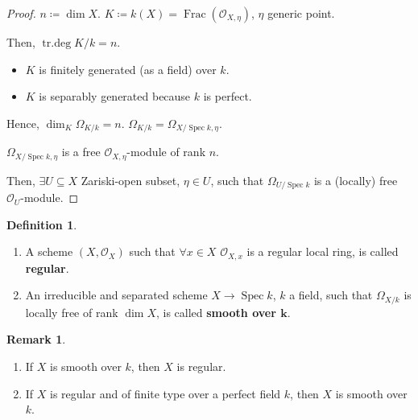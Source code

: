 \documentclass[12pt]{article}
\DeclareMathOperator{\Spec}{Spec}
\DeclareMathOperator{\Frac}{Frac}
\DeclareMathOperator{\trdeg}{tr.deg}
\theoremstyle{definition}
\newtheorem*{definition}{Definition}
\newtheorem*{remark}{Remark}
\theoremstyle{remark}
\begin{document}
\begin{proof}
$n\coloneqq\dim X$. $K\coloneqq k(X)=\Frac(\mathcal{O}_{X,\eta})$, $\eta$ generic point.

Then, $\trdeg K/k=n$.

\begin{itemize}[label=$-$]
\item $K$ is finitely generated (as a field) over $k$.

\item $K$ is separably generated because $k$ is perfect.
\end{itemize}

Hence, $\dim_K\Omega_{K/k}=n$. $\Omega_{K/k}=\Omega_{X/\Spec k,\eta}$.

$\Omega_{X/\Spec k,\eta}$ is a free $\mathcal{O}_{X,\eta}$-module of rank $n$.

Then, $\exists U\subseteq X$ Zariski-open subset, $\eta\in U$, such that $\Omega_{U/\Spec k}$ is a (locally) free $\mathcal{O}_U$-module.
\end{proof}

\begin{definition}
\begin{enumerate}[label=\arabic*)]
\item A scheme $(X,\mathcal{O}_X)$ such that $\forall x\in X$ $\mathcal{O}_{X,x}$ is a regular local ring, is called \textbf{regular}.

\item An irreducible and separated scheme $X\rightarrow\Spec k$, $k$ a field, such that $\Omega_{X/k}$ is locally free of rank $\dim X$, is called \textbf{smooth over $\boldsymbol{k}$}.
\end{enumerate}
\end{definition}

\begin{remark}
\begin{enumerate}[label=\arabic*)]
\item If $X$ is smooth over $k$, then $X$ is regular.

\item If $X$ is regular and of finite type over a perfect field $k$, then $X$ is smooth over $k$.
\end{enumerate}
\end{remark}
\end{document}
